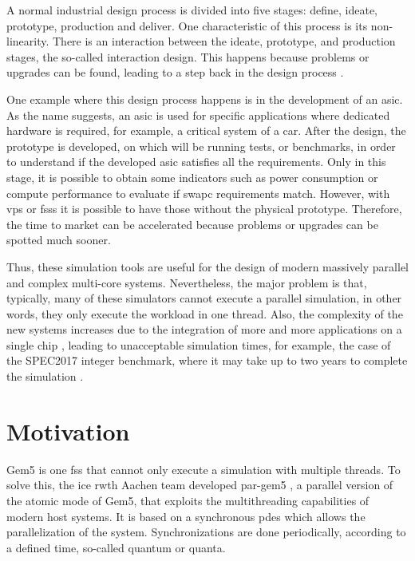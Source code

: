 
A normal industrial design process is divided into five stages: define, ideate, prototype, production and deliver. One characteristic of this 
process is its non-linearity. There is an interaction between the ideate, prototype, and production stages, the so-called interaction design. This 
happens because problems or upgrades can be found, leading to a step back in the design process \cite{ProductDesignSteps}.

One example where this design process happens is in the development of an \gls{asic}. As the name suggests, an \gls{asic} is used for specific 
applications where dedicated hardware is required, for example, a critical system of a car. After the design, the prototype is developed, on 
which will be running tests, or benchmarks, in order to understand if the developed \gls{asic} satisfies all the requirements. Only in this stage, 
it is possible to obtain some indicators such as power consumption or compute performance to evaluate if \gls{swapc} requirements match. However, 
with \glspl{vp} or \glspl{fss} it is possible to have those without the physical prototype. Therefore, the time to market can be accelerated 
because problems or upgrades can be spotted much sooner.

Thus, these simulation tools are useful for the design of modern massively parallel and complex multi-core systems. Nevertheless, the major 
problem is that, typically, many of these simulators cannot execute a parallel simulation, in other words, they only execute the workload in one 
thread. Also, the complexity of the new systems increases due to the integration of more and more applications on a single chip 
\cite{terascaleComputing}, leading to unacceptable simulation times, for example, the case of the SPEC2017 integer benchmark, where it may 
take up to two years to complete the simulation \cite{pargem5}.

\section{Motivation}

Gem5 is one \gls{fss} that cannot only execute a simulation with multiple threads. To solve this, the \gls{ice} \gls{rwth} Aachen team developed 
par-gem5 \cite{pargem5}, a parallel version of the atomic mode of Gem5, that exploits the multithreading capabilities of modern host systems. 
It is based on a synchronous \gls{pdes} which allows the parallelization of the system. Synchronizations are done periodically, according to a 
defined time, so-called quantum or quanta.

